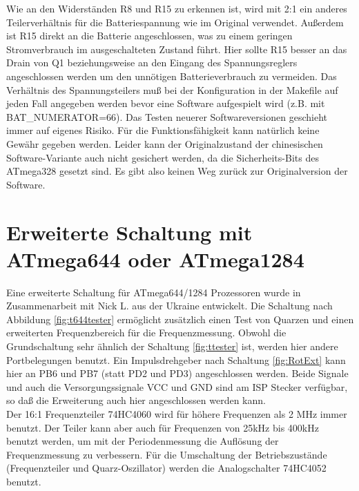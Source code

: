 Wie an den Widerständen R8 und R15 zu erkennen ist, 
wird mit 2:1 ein anderes Teilerverhältnis für die Batteriespannung wie im Original verwendet.
Außerdem ist R15 direkt an die Batterie angeschlossen, was zu einem geringen Stromverbrauch im
ausgeschalteten Zustand führt. Hier sollte R15 besser an das Drain von Q1 beziehungsweise an den
Eingang des Spannungsreglers angeschlossen werden um den unnötigen Batterieverbrauch zu vermeiden.
Das Verhältnis des Spannungsteilers muß bei der Konfiguration in der Makefile auf jeden Fall angegeben
werden bevor eine Software aufgespielt wird (z.B. mit BAT\_NUMERATOR=66).
Das Testen neuerer Softwareversionen geschieht immer auf eigenes Risiko.
Für die Funktionsfähigkeit kann natürlich keine Gewähr gegeben werden.
Leider kann der Originalzustand der chinesischen Software-Variante auch nicht gesichert werden,
da die Sicherheits-Bits des ATmega328 gesetzt sind.
Es gibt also keinen Weg zurück zur Originalversion der Software. 

\section{Erweiterte Schaltung mit ATmega644 oder ATmega1284}

Eine erweiterte Schaltung für ATmega644/1284 Prozessoren wurde in Zusammenarbeit mit Nick L. aus
der Ukraine entwickelt. Die Schaltung nach Abbildung \ref{fig:t644tester} ermöglicht zusätzlich
einen Test von Quarzen und einen erweiterten Frequenzbereich für die Frequenzmessung.
Obwohl die Grundschaltung sehr ähnlich der Schaltung \ref{fig:ttester} ist, werden hier
andere Portbelegungen benutzt.
Ein Impulsdrehgeber nach Schaltung \ref{fig:RotExt} kann hier an PB6 und PB7 (statt PD2 und PD3) angeschlossen werden.
Beide Signale und auch die Versorgungssignale VCC und GND sind am ISP Stecker verfügbar,
so daß die Erweiterung auch hier angeschlossen werden kann.\\

Der 16:1 Frequenzteiler 74HC4060 wird für höhere Frequenzen als 2 MHz immer benutzt.
Der Teiler kann aber auch für Frequenzen von 25kHz bis 400kHz benutzt werden, um mit der
Periodenmessung die Auflösung der Frequenzmessung zu verbessern.
Für die Umschaltung der Betriebszustände (Frequenzteiler und Quarz-Oszillator) werden
die Analogschalter 74HC4052 benutzt.


